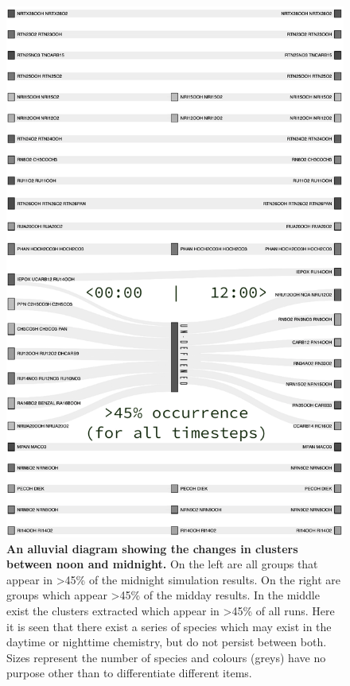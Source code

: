 \begin{figure}%
    \centering
\includegraphics[width=.9\textwidth]{fig/alluvial.png}
\caption{\textbf{An alluvial diagram showing the changes in clusters between noon and midnight.} On the left are all groups that appear in >45\% of the midnight simulation results. On the right are groups which appear >45\% of the midday results. In the middle exist the clusters extracted which appear in >45\% of all runs. Here it is seen that there exist a series of species which may exist in the daytime or nighttime chemistry, but do not persist between both. Sizes represent the number of species and colours (greys) have no purpose other than to differentiate different items. }
\label{fig:alluvial}
\end{figure}



